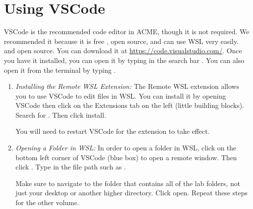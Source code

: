 \section*{Using VSCode}

VSCode is the recommended code editor in ACME, though it is not required.
We recommended it because it is free
\ifwindows
, open source, and can use WSL very easily.
\else
and open source.
\fi
You can download it at \url{https://code.visualstudio.com/}.
Once you have it installed, you can open it by typing in the search bar .
You can also open it from the terminal by typing .
\ifwindows
\begin{enumerate}
\item \emph{Installing the Remote WSL Extension:}
The Remote WSL extension allows you to use VSCode to edit files in WSL.
You can install it by opening VSCode then click on the Extensions tab on the left (little building blocks).
Search for .
Then click install.

You will need to restart VSCode for the extension to take effect.

\item \emph{Opening a Folder in WSL:}
In order to open a folder in WSL, click on the bottom left corner of VSCode (blue box) to open a remote window.
Then click .
Type in the file path such as .

Make sure to navigate to the folder that contains all of the lab folders, not just your desktop or another higher directory.
Click open.
\ifbootcamp
Repeat these steps for the other volume.
\fi

\end{enumerate}
\fi
\ifbootcamp
